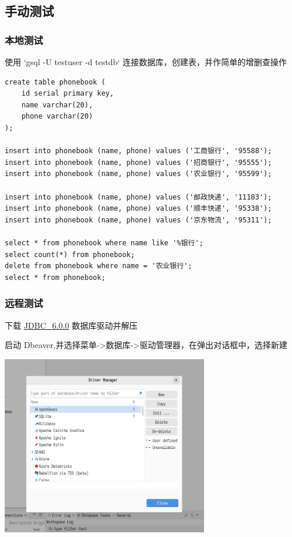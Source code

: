 \documentclass{article}
\begin{document}
\subsection{手动测试}

\subsubsection{本地测试}
使用 `gsql -U testuser -d testdb` 连接数据库，创建表，并作简单的增删查操作
\begin{verbatim}
create table phonebook (
    id serial primary key,
    name varchar(20),
    phone varchar(20)
);

insert into phonebook (name, phone) values ('工商银行', '95588');
insert into phonebook (name, phone) values ('招商银行', '95555');
insert into phonebook (name, phone) values ('农业银行', '95599');

insert into phonebook (name, phone) values ('邮政快递', '11183');
insert into phonebook (name, phone) values ('顺丰快递', '95338');
insert into phonebook (name, phone) values ('京东物流', '95311');

select * from phonebook where name like '%银行';
select count(*) from phonebook;
delete from phonebook where name = '农业银行';
select * from phonebook;
\end{verbatim}

\subsubsection{远程测试}

下载 \href{https://opengauss.org/zh/download/}{JDBC\_6.0.0} 数据库驱动并解压

启动 Dbeaver,并选择菜单->数据库->驱动管理器，在弹出对话框中，选择新建

\begin{center}
\includegraphics[width=9cm]{./image/1.png}
\end{center}
\end{document}
